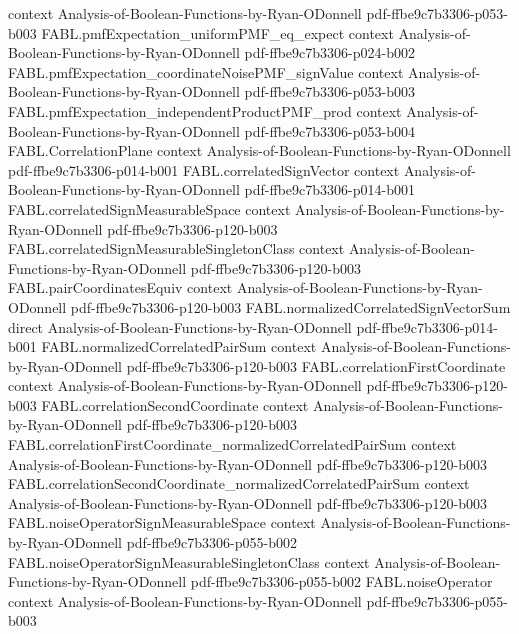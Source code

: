 \begin{theorem}
  {context}
  {Analysis-of-Boolean-Functions-by-Ryan-ODonnell}
  {pdf-ffbe9c7b3306-p053-b003}
\proofstep
  {FABL.pmfExpectation_uniformPMF_eq_expect}
  {context}
  {Analysis-of-Boolean-Functions-by-Ryan-ODonnell}
  {pdf-ffbe9c7b3306-p024-b002}
\proofstep
  {FABL.pmfExpectation_coordinateNoisePMF_signValue}
  {context}
  {Analysis-of-Boolean-Functions-by-Ryan-ODonnell}
  {pdf-ffbe9c7b3306-p053-b003}
\proofstep
  {FABL.pmfExpectation_independentProductPMF_prod}
  {context}
  {Analysis-of-Boolean-Functions-by-Ryan-ODonnell}
  {pdf-ffbe9c7b3306-p053-b004}
\proofstep
  {FABL.CorrelationPlane}
  {context}
  {Analysis-of-Boolean-Functions-by-Ryan-ODonnell}
  {pdf-ffbe9c7b3306-p014-b001}
\proofstep
  {FABL.correlatedSignVector}
  {context}
  {Analysis-of-Boolean-Functions-by-Ryan-ODonnell}
  {pdf-ffbe9c7b3306-p014-b001}
\proofstep
  {FABL.correlatedSignMeasurableSpace}
  {context}
  {Analysis-of-Boolean-Functions-by-Ryan-ODonnell}
  {pdf-ffbe9c7b3306-p120-b003}
\proofstep
  {FABL.correlatedSignMeasurableSingletonClass}
  {context}
  {Analysis-of-Boolean-Functions-by-Ryan-ODonnell}
  {pdf-ffbe9c7b3306-p120-b003}
\proofstep
  {FABL.pairCoordinatesEquiv}
  {context}
  {Analysis-of-Boolean-Functions-by-Ryan-ODonnell}
  {pdf-ffbe9c7b3306-p120-b003}
\proofstep
  {FABL.normalizedCorrelatedSignVectorSum}
  {direct}
  {Analysis-of-Boolean-Functions-by-Ryan-ODonnell}
  {pdf-ffbe9c7b3306-p014-b001}
\proofstep
  {FABL.normalizedCorrelatedPairSum}
  {context}
  {Analysis-of-Boolean-Functions-by-Ryan-ODonnell}
  {pdf-ffbe9c7b3306-p120-b003}
\proofstep
  {FABL.correlationFirstCoordinate}
  {context}
  {Analysis-of-Boolean-Functions-by-Ryan-ODonnell}
  {pdf-ffbe9c7b3306-p120-b003}
\proofstep
  {FABL.correlationSecondCoordinate}
  {context}
  {Analysis-of-Boolean-Functions-by-Ryan-ODonnell}
  {pdf-ffbe9c7b3306-p120-b003}
\proofstep
  {FABL.correlationFirstCoordinate_normalizedCorrelatedPairSum}
  {context}
  {Analysis-of-Boolean-Functions-by-Ryan-ODonnell}
  {pdf-ffbe9c7b3306-p120-b003}
\proofstep
  {FABL.correlationSecondCoordinate_normalizedCorrelatedPairSum}
  {context}
  {Analysis-of-Boolean-Functions-by-Ryan-ODonnell}
  {pdf-ffbe9c7b3306-p120-b003}
\proofstep
  {FABL.noiseOperatorSignMeasurableSpace}
  {context}
  {Analysis-of-Boolean-Functions-by-Ryan-ODonnell}
  {pdf-ffbe9c7b3306-p055-b002}
\proofstep
  {FABL.noiseOperatorSignMeasurableSingletonClass}
  {context}
  {Analysis-of-Boolean-Functions-by-Ryan-ODonnell}
  {pdf-ffbe9c7b3306-p055-b002}
\proofstep
  {FABL.noiseOperator}
  {context}
  {Analysis-of-Boolean-Functions-by-Ryan-ODonnell}
  {pdf-ffbe9c7b3306-p055-b003}
\proofstep

\end{theorem}
